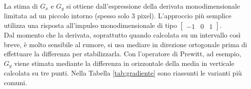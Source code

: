 La stima di $G_{x}$ e $G_{y}$ si ottiene dall'espressione della derivata monodimensionale limitata ad un piccolo intorno (spesso solo 3 pixel).
L'approccio più semplice utilizza una risposta all'impulso monodimensionale di tipo $\left [\begin{matrix}-1 & 0 & 1\end{matrix}\right ]$.\\

Dal momento che la derivata, soprattutto quando calcolata su un intervallo così breve, è molto sensibile al rumore, si usa mediare in direzione ortogonale prima di effettuare la differenza per stabilizzarla. 
Con l'operatore di Prewitt, ad esempio, $G_{y}$ viene stimata mediante la differenza in orizzontale della media in verticale calcolata su tre punti.
Nella Tabella \ref{tab:gradiente} sono riassunti le varianti più comuni.

